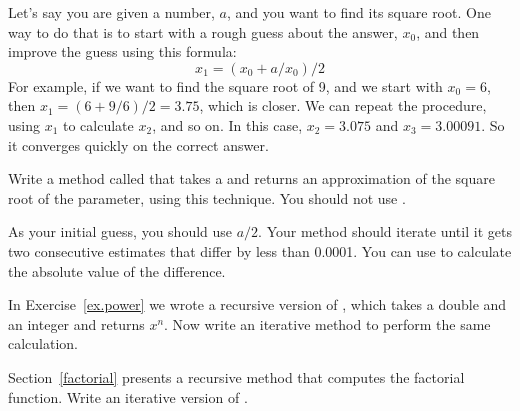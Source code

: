 \begin{exercise}  %

Let's say you are given a number, $a$, and you want to find its square root.
One way to do that is to start with a rough guess about the answer, $x_0$, and then improve the guess using this formula:
%
\[ x_1 =(x_0 + a/x_0) / 2 \]
%
For example, if we want to find the square root of 9, and we start with $x_0 = 6$, then $x_1 = (6 + 9/6) / 2 = 3.75$, which is closer.
We can repeat the procedure, using $x_1$ to calculate $x_2$, and so on.
In this case, $x_2 = 3.075$ and $x_3 = 3.00091$.
So it converges quickly on the correct answer.

Write a method called  that takes a  and returns an approximation of the square root of the parameter, using this technique.
You should not use .

As your initial guess, you should use $a/2$.
Your method should iterate until it gets two consecutive estimates that differ by less than 0.0001.
You can use  to calculate the absolute value of the difference.

\end{exercise}


\begin{exercise}  %

In Exercise~\ref{ex.power} we wrote a recursive version of , which takes a double  and an integer  and returns $x^n$.
Now write an iterative method to perform the same calculation.

\end{exercise}


\begin{exercise}  %

Section~\ref{factorial} presents a recursive method that computes the factorial function.
Write an iterative version of .

\end{exercise}


